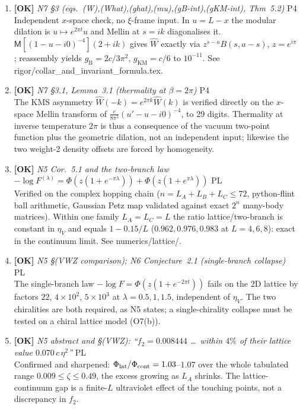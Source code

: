 \documentclass[11pt]{article}
\begin{document}
\begin{enumerate}[leftmargin=1.6em,itemsep=6pt]
\item \textbf{[OK]} \emph{N7 \S3 (eqs.\ (W),(What),(ghat),(mu),(gB-int),(gKM-int), Thm~5.2)} \hfill\textsc{P4}\\ Independent \(x\)-space check, no \(\xi\)-frame input. In \(u=L-x\) the modular dilation is \(u\mapsto e^{2\pi t}u\) and Mellin at \(s=ik\) diagonalises it. \(\mathsf M[(1-u-i0)^{-4}](2+ik)\) gives \(\widehat W\) exactly via \(z^{s-a}B(s,a-s)\), \(z=e^{i\pi}\); reassembly yields \(g_{\mathrm B}=2c/3\pi^2\), \(g_{\mathrm{KM}}=c/6\) to \(10^{-11}\). See rigor/collar\_and\_invariant\_formula.tex.
\item \textbf{[OK]} \emph{N7 \S3.1, Lemma~3.1 (thermality at \(\beta=2\pi\))} \hfill\textsc{P4}\\ The KMS asymmetry \(\widehat W(-k)=e^{2\pi k}\widehat W(k)\) is verified directly on the \(x\)-space Mellin transform of \(\frac{c}{8\pi^2}(u'-u-i0)^{-4}\), to 29 digits. Thermality at inverse temperature \(2\pi\) is thus a consequence of the vacuum two-point function plus the geometric dilation, not an independent input; likewise the two weight-2 density offsets are forced by homogeneity.
\item \textbf{[OK]} \emph{N5 Cor.~5.1 and the two-branch law \(-\log F^{(\lambda)}=\Phi(z(1+e^{-\pi\lambda}))+\Phi(z(1+e^{\pi\lambda}))\)} \hfill\textsc{PL}\\ Verified on the complex hopping chain (\(n=L_A{+}L_B{+}L_C\le72\), python-flint ball arithmetic, Gaussian Petz map validated against exact \(2^n\) many-body matrices). Within one family \(L_A=L_C=L\) the ratio lattice/two-branch is constant in \(\eta_V\) and equals \(1-0.15/L\) (\(0.962,0.976,0.983\) at \(L=4,6,8\)): exact in the continuum limit. See numerics/lattice/.
\item \textbf{[OK]} \emph{N5 \S(VWZ comparison); N6 Conjecture~2.1 (single-branch collapse)} \hfill\textsc{PL}\\ The single-branch law \(-\log F=\Phi(z(1+e^{-2\pi t}))\) fails on the 2D lattice by factors \(22\), \(4\times10^2\), \(5\times10^3\) at \(\lambda=0.5,1,1.5\), independent of \(\eta_V\). The two chiralities are both required, as N5 states; a single-chirality collapse must be tested on a chiral lattice model (O7(b)).
\item \textbf{[OK]} \emph{N5 abstract and \S(VWZ): ``\(f_2=0.008444\) \dots\ within \(4\%\) of their lattice value \(0.070\,c\,\eta^2\)''} \hfill\textsc{PL}\\ Confirmed and sharpened: \(\Phi_{\rm lat}/\Phi_{\rm cont}=1.03\)--\(1.07\) over the whole tabulated range \(0.009\le\zeta\le0.49\), the excess growing as \(L_A\) shrinks. The lattice-continuum gap is a finite-\(L\) ultraviolet effect of the touching points, not a discrepancy in \(f_2\).

\end{enumerate}
\end{document}
